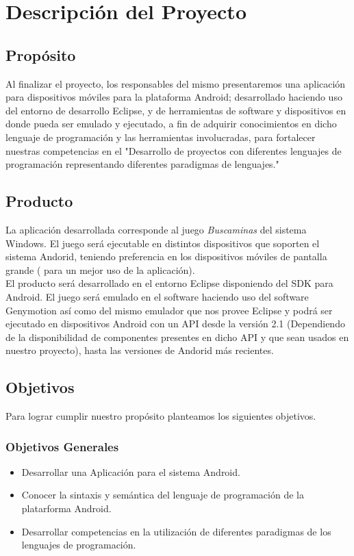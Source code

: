 \documentclass[11pt]{article} %
\begin{document}
\section{\textbf{Descripci\'on del Proyecto}}
\subsection{\textbf{Prop\'osito}}
Al finalizar el proyecto, los responsables del mismo presentaremos una aplicaci\'on para dispositivos m\'oviles para la plataforma Android; desarrollado haciendo uso del entorno de desarrollo Eclipse, y de herramientas de software y dispositivos en donde pueda ser emulado y ejecutado, a fin de adquirir conocimientos en dicho lenguaje de programaci\'on y las herramientas involucradas, para fortalecer nuestras competencias en el "Desarrollo de proyectos con diferentes lenguajes de programaci\'on representando diferentes paradigmas de lenguajes."
\subsection{\textbf{Producto}}
La aplicaci\'on desarrollada corresponde al juego \textsl{Buscaminas} del sistema Windows. El juego será ejecutable en distintos dispositivos que soporten el sistema Andorid, teniendo preferencia en los dispositivos m\'oviles de pantalla grande ( para un mejor uso de la aplicaci\'on).
\\El producto ser\'a desarrollado en el entorno Eclipse disponiendo del SDK para Android. El juego ser\'a emulado en el software haciendo uso del software Genymotion as\'i como del mismo emulador que nos provee Eclipse y podr\'a ser ejecutado en dispositivos Android con un API desde la versi\'on 2.1 (Dependiendo de la disponibilidad de componentes presentes en dicho API y que sean usados en nuestro proyecto), hasta las versiones de Andorid m\'as recientes.
\subsection{\textbf{Objetivos}}
Para lograr cumplir nuestro prop\'osito planteamos los siguientes objetivos.
\subsubsection{\textbf{Objetivos Generales}}
\begin{itemize}
\item Desarrollar una Aplicaci\'on para el sistema Android.
\item Conocer la sintaxis y sem\'antica del lenguaje de programaci\'on de la platarforma Android.
\item Desarrollar competencias en la utilizaci\'on de diferentes paradigmas de los lenguajes de programaci\'on.
\end{itemize}
\end{document}
